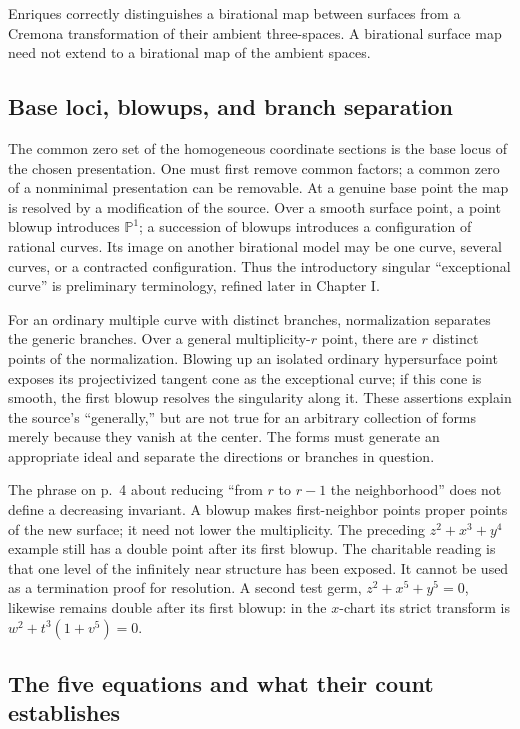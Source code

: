 Enriques correctly distinguishes a birational map between surfaces from a Cremona transformation of their ambient three-spaces. A birational surface map need not extend to a birational map of the ambient spaces.

\subsection{Base loci, blowups, and branch separation}

The common zero set of the homogeneous coordinate sections is the base locus of the chosen presentation. One must first remove common factors; a common zero of a nonminimal presentation can be removable. At a genuine base point the map is resolved by a modification of the source. Over a smooth surface point, a point blowup introduces \(\mathbb P^1\); a succession of blowups introduces a configuration of rational curves. Its image on another birational model may be one curve, several curves, or a contracted configuration. Thus the introductory singular ``exceptional curve'' is preliminary terminology, refined later in Chapter I.

For an ordinary multiple curve with distinct branches, normalization separates the generic branches. Over a general multiplicity-\(r\) point, there are \(r\) distinct points of the normalization. Blowing up an isolated ordinary hypersurface point exposes its projectivized tangent cone as the exceptional curve; if this cone is smooth, the first blowup resolves the singularity along it. These assertions explain the source's ``generally,'' but are not true for an arbitrary collection of forms merely because they vanish at the center. The forms must generate an appropriate ideal and separate the directions or branches in question.

The phrase on p.~4 about reducing ``from \(r\) to \(r-1\) the neighborhood'' does not define a decreasing invariant. A blowup makes first-neighbor points proper points of the new surface; it need not lower the multiplicity. The preceding \(z^2+x^3+y^4\) example still has a double point after its first blowup. The charitable reading is that one level of the infinitely near structure has been exposed. It cannot be used as a termination proof for resolution. A second test germ, \(z^2+x^5+y^5=0\), likewise remains double after its first blowup: in the \(x\)-chart its strict transform is \(w^2+t^3(1+v^5)=0\).

\subsection{The five equations and what their count establishes}

